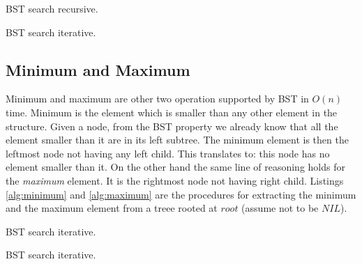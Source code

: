 \begin{algorithm}
\caption{BST search recursive.}\label{alg:searchrec}
\end{algorithm}


\begin{algorithm}
\caption{BST search iterative.}\label{alg:searchite}
\end{algorithm}


\subsection{Minimum and Maximum}
Minimum and maximum are other two operation supported by BST in $O(n)$ time.
Minimum is the element which is smaller than any other element in the structure. Given a node, from the BST property we already know that all the element smaller than it are in its left subtree.
The minimum element is then the leftmost node not having any left child. This translates to: this node has no element smaller than it.
On the other hand the same line of reasoning holds for the \textit{maximum} element. It is the rightmost node not having right child. Listings \ref{alg:minimum} and \ref{alg:maximum} are the procedures for extracting the minimum and the maximum element from a treee rooted at $root$ (assume not to be $NIL$).

\begin{algorithm}
\caption{BST search iterative.}\label{alg:minimum}
\end{algorithm}

\begin{algorithm}
\caption{BST search iterative.}\label{alg:minimum}
\end{algorithm}

